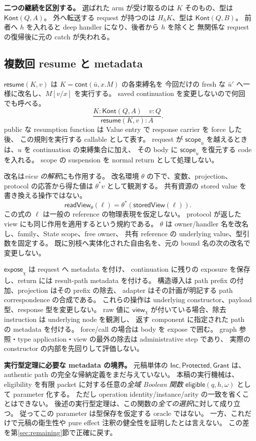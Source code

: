 \documentclass[11pt,a4paper]{article}
\newcommand{\Resume}{\mathsf{resume}}
\newcommand{\Scope}{\mathsf{scope}}
\newcommand{\View}{\mathsf{view}}
\begin{document}
\textbf{二つの継続を区別する。}
選ばれた arm が受け取るのは \(K\) そのもの、型は \(\mathsf{Kont}(Q,A)\)。
外へ転送する request が持つのは \(H_hK\)、型は \(\mathsf{Kont}(Q,B)\)。
前者へ \(h\) を入れると deep handler になり、後者から \(h\) を除くと
無関係な request の復帰後に元の catch が失われる。

\subsection{複数回 resume と metadata}

\(\Resume(K,v)\) は \(K=\mathsf{cont}(\bar u,x.M)\) の各束縛名を
今回だけの fresh な \(\bar u'\) へ一様に改名し、\(M[v/x]\) を実行する。
saved continuation を変更しないので何回でも呼べる。
\[
 \frac{K:\mathsf{Kont}(Q,A)\quad v:Q}{\Resume(K,v):A}.
\]
public な resumption function は Value entry で response carrier を force した後、
この規則を実行する callable として表す。
request が \(\Scope_u\) を越えるときは、\(u\) を continuation の束縛集合に加え、
その body に \(\Scope_u\) を復元する code を入れる。
scope の suspension を normal return として処理しない。

改名は\emph{view の解釈}にも作用する。
改名環境 \(\theta\) の下で、変数、projection、protocol の応答から得た値は
\(\theta^*v\) として観測する。
共有資源の stored value を書き換える操作ではない。
\[
 \mathsf{readView}_{\theta}(\ell)=\theta^*(\mathsf{storedView}(\ell)).
\]
この式の \(\ell\) は一般の reference の物理表現を仮定しない。
protocol が返した view にも同じ作用を適用するという規約である。
\(\theta\) は owner/handler 名を改名し、family、State scope、free owner、
共有 reference の underlying value、型引数を固定する。
既に別枝へ実体化された自由名を、元の bound 名の次の改名で変更しない。

\(\mathsf{expose}_\chi\) は request へ metadata を付け、
continuation に残りの exposure を保存し、return には result-path metadata を付ける。
構造導入は path prefix の付加、projection はその prefix の除去、
adapter はその計画が明記する path correspondence の合成である。
これらの操作は underlying constructor、payload 型、response 型を変更しない。
raw 値に \(\View_\chi\) が付いている場合、除去 instruction は underlying node を観測し、
返す component に指定された path の metadata を付ける。
force/call の場合は body を expose で囲む。
graph 参照・type application・view の最外の除去は administrative step であり、
実際の constructor の内部を先回りして評価しない。

\textbf{実行型定理に必要な metadata の境界。}
元稿単体の \(\mathsf{Inc},\mathsf{Protected},\mathsf{Grant}\) は、
authentic path の完全な帰納定義をまだ与えていない。
本稿の実行機械は、eligibility を有限 packet に対する任意の\emph{全域 Boolean 関数}
\(\mathsf{eligible}(q,h,\omega)\) として parameter 化する。
ただし operation identity/instance/arity の一致を省くことはできない。
後述の実行型定理は、この関数の\emph{全ての選択}に対して成り立つ。
従ってこの parameter は型保存を仮定する oracle ではない。
一方、これだけで元稿の衛生性や pure effect 注釈の健全性を証明したとは言えない。
この差を第\ref{sec:remaining}節で正確に戻す。
\end{document}
